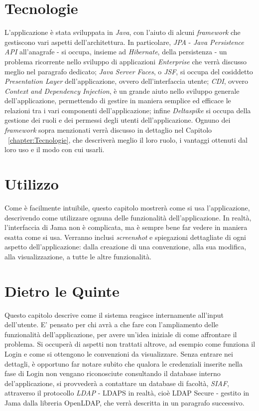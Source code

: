 \section{Tecnologie}
L'applicazione è stata sviluppata in \textsl{Java}, con l'aiuto di alcuni \textit{framework} che gestiscono vari aspetti dell'architettura. In particolare, \textsl{JPA} - \textsl{Java Persistence API} all'anagrafe - si occupa, insieme ad \textsl{Hibernate}, della persistenza - un problema ricorrente nello sviluppo di applicazioni \textit{Enterprise}  che verrà discusso meglio nel paragrafo dedicato; \textsl{Java Server Faces}, o \textsl{JSF}, si occupa del cosiddetto \textsl{Presentation Layer} dell'applicazione, ovvero dell'interfaccia utente; \textsl{CDI}, ovvero \textsl{Context and Dependency Injection}, è un grande aiuto nello sviluppo generale dell'applicazione, permettendo di gestire in maniera semplice ed efficace le relazioni tra i vari componenti dell'applicazione; infine \textsl{Deltaspike} si occupa della gestione dei ruoli e dei permessi degli utenti dell'applicazione.\newline
Ognuno dei \textit{framework} sopra menzionati verrà discusso in dettaglio  nel Capitolo ~\ref{chapter:Tecnologie}, che descriverà meglio il loro ruolo, i vantaggi ottenuti dal loro uso e il modo con cui usarli.
\section{Utilizzo}
Come è facilmente intuibile, questo capitolo mostrerà come si usa l'applicazione, descrivendo come utilizzare ognuna delle funzionalità dell'applicazione. In realtà, l'interfaccia di Jama non è complicata, ma è sempre bene far vedere in maniera esatta come si usa. Verranno inclusi \textit{screenshot} e spiegazioni dettagliate di ogni aspetto dell'applicazione: dalla creazione di una convenzione, alla sua modifica, alla visualizzazione, a tutte le altre funzionalità.
\section{Dietro le Quinte}
Questo capitolo descrive come il sistema reagisce internamente all'input dell'utente. E' pensato per chi avrà a che fare con l'ampliamento delle funzionalità dell'applicazione, per avere un'idea iniziale di come affrontare il problema. Si occuperà di aspetti non trattati altrove, ad esempio come funziona il Login e come si ottengono le convenzioni da visualizzare.
Senza entrare nei dettagli, è opportuno far notare subito che qualora le credenziali inserite nella fase di Login non vengano riconosciute consultando il database interno del'applicazione, si provvederà a contattare un database di facoltà, \textsl{SIAF}, attraverso il protocollo \textsl{LDAP} - LDAPS in realtà, cioè LDAP Secure - gestito in Jama dalla libreria OpenLDAP, che verrà descritta in un paragrafo successivo.
